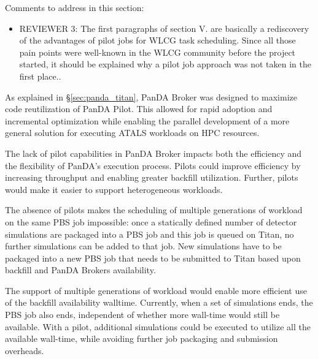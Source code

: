 \ifreview
Comments to address in this section:
\begin{itemize}
	\color{red} 
	\item REVIEWER 3: The first paragraphs of section V. are basically a
	rediscovery of the advantages of pilot jobs for WLCG task scheduling.
	Since all those pain points were well-known in the WLCG community before
	the project started, it should be explained why a pilot job approach was
	not taken in the first place..
\end{itemize}
\fi

As explained in \S\ref{sec:panda_titan}, PanDA Broker was designed to
maximize code reutilization of PanDA Pilot. This allowed for rapid adoption
and incremental optimization while enabling the parallel development of a
more general solution for executing ATALS workloads on HPC resources.

The lack of pilot capabilities in PanDA Broker impacts both the efficiency
and the flexibility of PanDA's execution process. Pilots could improve
efficiency by increasing throughput and enabling greater backfill
utilization. Further, pilots would make it easier to support heterogeneous
workloads.

The absence of pilots makes the scheduling of multiple generations of
workload on the same PBS job impossible: once a statically defined number of
detector simulations are packaged into a PBS job and this job is queued on
Titan, no further simulations can be added to that job. New simulations have
to be packaged into a new PBS job that needs to be submitted to Titan based
upon backfill and PanDA Brokers availability.

The support of multiple generations of workload would enable more efficient
use of the backfill availability walltime. Currently, when a set of
simulations ends, the PBS job also ends, independent of whether more
wall-time would still be available. With a pilot, additional simulations
could be executed to utilize all the available wall-time, while avoiding
further job packaging and submission overheads.

